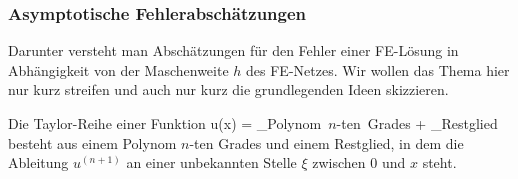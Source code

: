 \subsubsection{Asymptotische Fehlerabsch\"{a}tzungen}
{\small Darunter versteht man Absch\"{a}tzungen f\"{u}r den Fehler einer FE-L\"{o}sung in
Abh\"{a}ngigkeit von der Maschenweite $h$ des FE-Netzes. Wir wollen das Thema hier nur kurz
streifen und auch nur kurz die grundlegenden Ideen skizzieren.

Die Taylor-Reihe einer Funktion
\bfoo
u(x) = _{\mbox{Polynom $n$-ten Grades}} +
_{\mbox{Restglied}}
\efoo
besteht aus einem Polynom $n$-ten Grades und einem Restglied, in dem die Ableitung
$u^{(n+1)}$ an einer unbekannten Stelle $\xi$ zwischen $0$ und $x$ steht.

}
